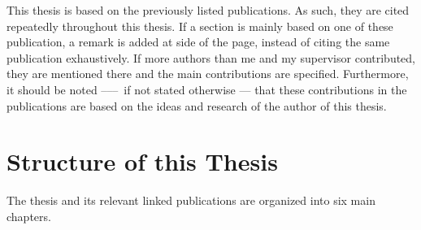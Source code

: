 This thesis is based on the previously listed publications. As such, they are cited repeatedly throughout this thesis. If a section is mainly based on one of these publication, a remark is added at side of the page, instead of citing the same publication exhaustively. If more authors than me and my supervisor contributed, they are mentioned there and the main contributions are specified.
Furthermore, it should be noted ––– if not stated otherwise ---  that these contributions in the publications are based on the ideas and research of the author of this thesis.

\section{Structure of this Thesis}

The thesis and its relevant linked publications are organized into six main chapters.
